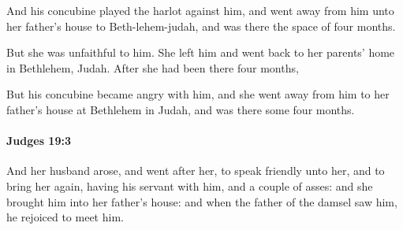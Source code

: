 			\begin{versebox}
					\item[BHS] 
					\item[ASV] And his concubine played the harlot against him, and went away from him unto her father's house to Beth-lehem-judah, and was there the space of four months.
					\item[NIV] But she was unfaithful to him. She left him and went back to her parents’ home in Bethlehem, Judah. After she had been there four months,
					\item[NRSV] But his concubine became angry with him, and she went away from him to her father’s house at Bethlehem in Judah, and was there some four months.
			\end{versebox}

		\paragraph{Judges 19:3} %
			\label{JUDGES-19-3}

			And her husband arose, and went after her, to speak friendly unto her, and to bring her again, having his servant with him, and a couple of asses: and she brought him into her father’s house: and when the father of the damsel saw him, he rejoiced to meet him.

